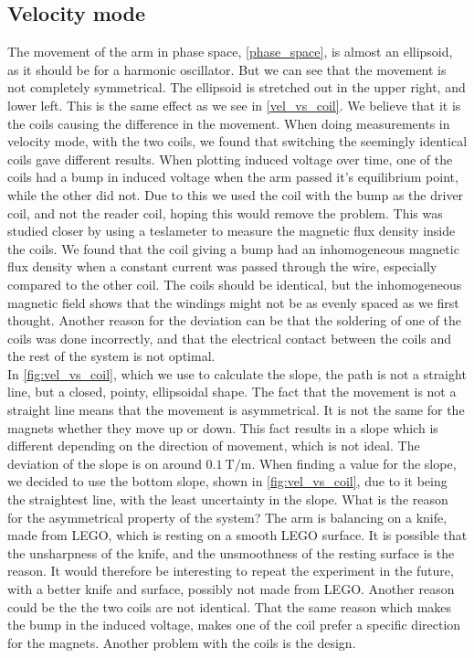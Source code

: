 \documentclass[english,a4paper,12pt,reprint]{revtex4-1}
\begin{document}
\subsection{Velocity mode}
The movement of the arm in phase space, \vref{phase_space}, is almost an ellipsoid, as it should be for a harmonic oscillator. But we can see that the movement is not completely symmetrical. The ellipsoid is stretched out in the upper right, and lower left. This is the same effect as we see in \vref{vel_vs_coil}. We believe that it is the coils causing the difference in the movement.
When doing measurements in velocity mode, with the two coils, we found that switching the seemingly identical coils gave different results. When plotting induced voltage over time, one of the coils had a bump in induced voltage when the arm passed it's equilibrium point, while the other did not. Due to this we used the coil with the bump as the driver coil, and not the reader coil, hoping this would remove the problem. This was studied closer by using a teslameter to measure the magnetic flux density inside the coils. We found that the coil giving a bump had an inhomogeneous magnetic flux density when a constant current was passed through the wire, especially compared to the other coil. The coils should be identical, but the inhomogeneous magnetic field shows that the windings might not be as evenly spaced as we first thought. Another reason for the deviation can be that the soldering of one of the coils was done incorrectly, and that the electrical contact between the coils and the rest of the system is not optimal. \\
In \vref{fig:vel_vs_coil}, which we use to calculate the slope, the path is not a straight line, but a closed, pointy, ellipsoidal shape. The fact that the movement is not a straight line means that the movement is asymmetrical. It is not the same for the magnets whether they move up or down. This fact results in a slope which is different depending on the direction of movement, which is not ideal. The deviation of the slope is on around $\SI{0.1}{\tesla/\meter}$. When finding a value for the slope, we decided to use the bottom slope, shown in \vref{fig:vel_vs_coil}, due to it being the straightest line, with the least uncertainty in the slope. What is the reason for the asymmetrical property of the system? The arm is balancing on a knife, made from LEGO, which is resting on a smooth LEGO surface. It is possible that the unsharpness of the knife, and the unsmoothness of the resting surface is the reason. It would therefore be interesting to repeat the experiment in the future, with a better knife and surface, possibly not made from LEGO. Another reason could be the the two coils are not identical. That the same reason which makes the bump in the induced voltage, makes one of the coil prefer a specific direction for the magnets. Another problem with the coils is the design.
\end{document}
